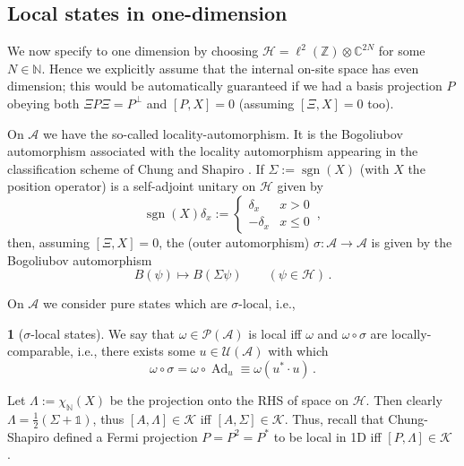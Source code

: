 \documentclass[a4paper,10pt]{article}
\numberwithin{equation}{section}
\theoremstyle{plain}
\theoremstyle{plain}
\theoremstyle{plain}
\theoremstyle{plain}
\theoremstyle{plain}
\theoremstyle{remark}
\theoremstyle{definition}
\newtheorem{defn}[defn]{\protect\definitionname}
\providecommand{\definitionname}{Definition}
\newcommand{\NN}{\mathbb{N}}
\newcommand{\calH}{\mathcal{H}}
\newcommand{\calK}{\mathcal{K}}
\newcommand{\Id}{\mathds{1}}
\newcommand{\sgn}{\operatorname{sgn}}
\newcommand{\br}[1]{\left(#1\right)}
\begin{document}
\subsection{Local states in one-dimension}

We now specify to one dimension by choosing $\mathcal{H}=\ell^{2}\left(\mathbb{Z}\right)\otimes\mathbb{C}^{2N}$
for some $N\in\mathbb{N}$. Hence we explicitly assume that the internal on-site space has even dimension; this would be automatically guaranteed if we had a basis projection $P$ obeying both $\Xi P \Xi=P^\perp$ and $[P,X]=0$ (assuming $[\Xi,X]=0$ too).


On $\mathcal{A}$ we have the so-called locality-automorphism. It is the Bogoliubov automorphism associated with the locality automorphism appearing in the classification scheme of Chung and Shapiro \cite{ChungShapiro2023}.
If $\Sigma:=\sgn\left(X\right)$ (with $X$ the position operator)
is a self-adjoint unitary on $\mathcal{H}$ given by 
\[
\sgn\left(X\right)\delta_{x}:=\begin{cases}
\delta_{x} & x>0\\
-\delta_{x} & x\leq0
\end{cases}\, ,
\]
then, assuming $\left[\Xi,X\right]=0$, the (outer automorphism) $\sigma:\mathcal{A}\to\mathcal{A}$
is given by the Bogoliubov automorphism 
\[
B\left(\psi\right)\mapsto B\left(\Sigma\psi\right)\qquad\left(\psi\in\mathcal{H}\right)\,.
\]

On $\mathcal{A}$ we consider pure states
which are $\sigma$-local, i.e.,
\begin{defn}[$\sigma$-local states]
 We say that $\omega\in\mathcal{P}\left(\mathcal{A}\right)$ is local
iff $\omega$ and $\omega\circ\sigma$ are locally-comparable, i.e.,
there exists some $u\in\mathcal{U}\left(\mathcal{A}\right)$ with
which 
\[
\omega\circ\sigma=\omega\circ\operatorname{Ad}_{u}\equiv\omega\left(u^{\ast}\cdot u\right)\,.
\]
\end{defn}

Let $\Lambda := \chi_\NN(X)$ be the projection onto the RHS of space on $\calH$. Then clearly $\Lambda=\frac12\br{\Sigma+\Id}$, thus $[A,\Lambda]\in\calK$ iff $[A,\Sigma]\in\calK$. Thus, recall that Chung-Shapiro defined a Fermi projection $P=P^2=P^\ast$  to be local in 1D iff $[P,\Lambda]\in\calK$ \cite{ChungShapiro2023}.
\end{document}
